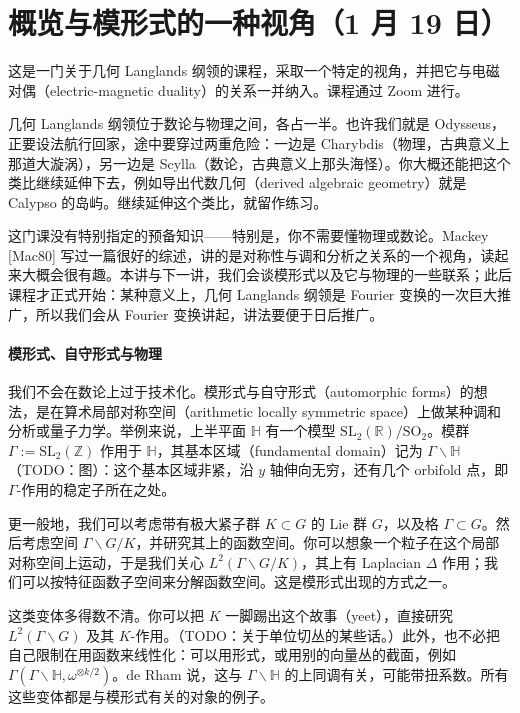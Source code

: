 \section[概览与模形式的一种视角]{概览与模形式的一种视角（1 月 19 日）}

这是一门关于几何 Langlands 纲领的课程，采取一个特定的视角，并把它与电磁对偶（electric-magnetic duality）的关系一并纳入。课程通过 Zoom 进行。

几何 Langlands 纲领位于数论与物理之间，各占一半。也许我们就是 Odysseus，正要设法航行回家，途中要穿过两重危险：一边是 Charybdis（物理，古典意义上那道大漩涡），另一边是 Scylla（数论，古典意义上那头海怪）。你大概还能把这个类比继续延伸下去，例如导出代数几何（derived algebraic geometry）就是 Calypso 的岛屿。继续延伸这个类比，就留作练习。

这门课没有特别指定的预备知识——特别是，你不需要懂物理或数论。Mackey [Mac80] 写过一篇很好的综述，讲的是对称性与调和分析之关系的一个视角，读起来大概会很有趣。本讲与下一讲，我们会谈模形式以及它与物理的一些联系；此后课程才正式开始：某种意义上，几何 Langlands 纲领是 Fourier 变换的一次巨大推广，所以我们会从 Fourier 变换讲起，讲法要便于日后推广。

\paragraph{模形式、自守形式与物理}

我们不会在数论上过于技术化。模形式与自守形式（automorphic forms）的想法，是在算术局部对称空间（arithmetic locally symmetric space）上做某种调和分析或量子力学。举例来说，上半平面 $\mathbb{H}$ 有一个模型 $\mathrm{SL}_2(\mathbb{R})/\mathrm{SO}_2$。模群 $\Gamma := \mathrm{SL}_2(\mathbb{Z})$ 作用于 $\mathbb{H}$，其基本区域（fundamental domain）记为 $\Gamma\backslash\mathbb{H}$（TODO：图）：这个基本区域非紧，沿 $y$ 轴伸向无穷，还有几个 orbifold 点，即 $\Gamma$-作用的稳定子所在之处。

更一般地，我们可以考虑带有极大紧子群 $K\subset G$ 的 Lie 群 $G$，以及格 $\Gamma\subset G$。然后考虑空间 $\Gamma\backslash G/K$，并研究其上的函数空间。你可以想象一个粒子在这个局部对称空间上运动，于是我们关心 $L^2(\Gamma\backslash G/K)$，其上有 Laplacian $\Delta$ 作用；我们可以按特征函数子空间来分解函数空间。这是模形式出现的方式之一。

这类变体多得数不清。你可以把 $K$ 一脚踢出这个故事（yeet），直接研究 $L^2(\Gamma\backslash G)$ 及其 $K$-作用。（TODO：关于单位切丛的某些话。）此外，也不必把自己限制在用函数来线性化：可以用形式，或用别的向量丛的截面，例如 $\Gamma(\Gamma\backslash\mathbb{H},\omega^{\otimes k/2})$。de Rham 说，这与 $\Gamma\backslash\mathbb{H}$ 的上同调有关，可能带扭系数。所有这些变体都是与模形式有关的对象的例子。

